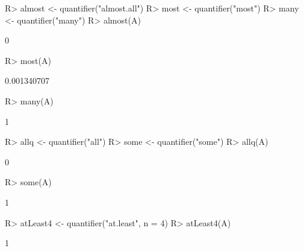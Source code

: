 \documentclass{article}\usepackage[]{graphicx}\usepackage[]{color}
\begin{document}
\begin{Schunk}
% --begin: "quant5"
\begin{Sinput}
R> almost <- quantifier("almost.all")
R> most <- quantifier("most")
R> many <- quantifier("many")
R> almost(A)
\end{Sinput}
\begin{Soutput}
[1] 0
\end{Soutput}
\begin{Sinput}
R> most(A)
\end{Sinput}
\begin{Soutput}
[1] 0.001340707
\end{Soutput}
\begin{Sinput}
R> many(A)
\end{Sinput}
\begin{Soutput}
[1] 1
\end{Soutput}
%
% --end: "quant5"
\end{Schunk}

\begin{Schunk}
% --begin: "quant6"
\begin{Sinput}
R> allq <- quantifier("all")
R> some <- quantifier("some")
R> allq(A)
\end{Sinput}
\begin{Soutput}
[1] 0
\end{Soutput}
\begin{Sinput}
R> some(A)
\end{Sinput}
\begin{Soutput}
[1] 1
\end{Soutput}
%
% --end: "quant6"
\end{Schunk}

\begin{Schunk}
% --begin: "quant7"
\begin{Sinput}
R> atLeast4 <- quantifier("at.least", n = 4)
R> atLeast4(A)
\end{Sinput}
\begin{Soutput}
[1] 1
\end{Soutput}
%
% --end: "quant7"
\end{Schunk}
\end{document}
